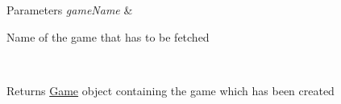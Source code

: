 \begin{DoxyParams}{Parameters}
{\em game\+Name} & 
\begin{DoxyItemize}
\item Name of the game that has to be fetched
\end{DoxyItemize}\\
\hline
\end{DoxyParams}
\begin{DoxyReturn}{Returns}
\hyperlink{class_game}{Game} object containing the game which has been created 
\end{DoxyReturn}
